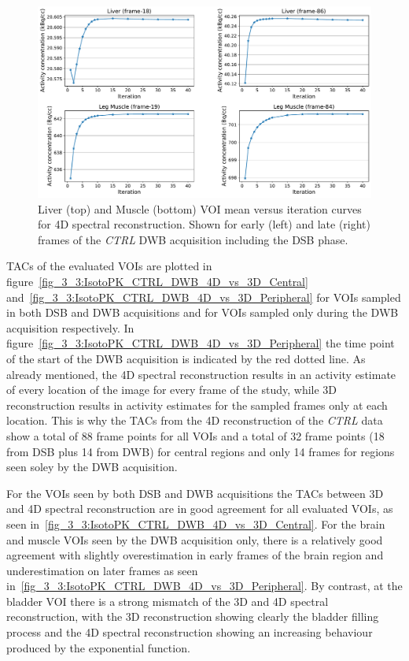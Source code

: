 \begin{figure} [h!]
\centering
\includegraphics[scale=0.5,angle=0]{3_Results/3_3_DWB_Reconstruction/figures/3_3_IsotoPK_CTRL_DWB_4D_Convergence.pdf}
\caption{Liver (top) and Muscle (bottom) VOI mean versus iteration curves for 4D spectral reconstruction. Shown for early (left) and late (right) frames of the \textit{CTRL} DWB acquisition including the DSB phase.}
\label{fig_3_3:IsotoPK_CTRL_DSB_4D_Convergence}
\end{figure} 

TACs of the evaluated VOIs are plotted in figure~\ref{fig_3_3:IsotoPK_CTRL_DWB_4D_vs_3D_Central} and~\ref{fig_3_3:IsotoPK_CTRL_DWB_4D_vs_3D_Peripheral} for VOIs sampled in both DSB and DWB acquisitions and for VOIs sampled only during the DWB acquisition respectively. In figure~\ref{fig_3_3:IsotoPK_CTRL_DWB_4D_vs_3D_Peripheral} the time point of the start of the DWB acquisition is indicated by the red dotted line.
As already mentioned, the 4D spectral reconstruction results in an activity estimate of every location of the image for every frame of the study, while 3D reconstruction results in activity estimates for the sampled frames only at each location. This is why the TACs from the 4D reconstruction of the \textit{CTRL} data show a total of 88 frame points for all VOIs and a total of 32 frame points (18 from DSB plus 14 from DWB) for central regions and only 14 frames for regions seen soley by the DWB acquisition. 

For the VOIs seen by both DSB and DWB acquisitions the TACs between 3D and 4D spectral reconstruction are in good agreement for all evaluated VOIs, as seen in~\ref{fig_3_3:IsotoPK_CTRL_DWB_4D_vs_3D_Central}. For the brain and muscle VOIs seen by the DWB acquisition only, there is a relatively good agreement with slightly overestimation in early frames of the brain region and underestimation on later frames as seen in~\ref{fig_3_3:IsotoPK_CTRL_DWB_4D_vs_3D_Peripheral}. By contrast, at the bladder VOI there is a strong mismatch of the 3D and 4D spectral reconstruction, with the 3D reconstruction showing clearly the bladder filling process and the 4D spectral reconstruction showing an increasing behaviour produced by the exponential function. 

